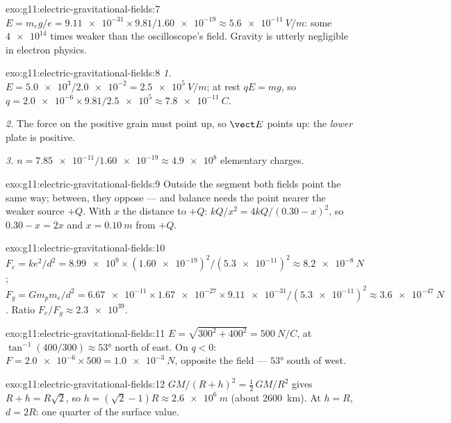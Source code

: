 \begin{solution}{exo:g11:electric-gravitational-fields:7}
$E = m_e g / e = \num{9.11e-31} \times 9.81 / \num{1.60e-19}
\approx \qty{5.6e-11}{V/m}$: some $\num{4e14}$ times weaker than the
oscilloscope's field. Gravity is utterly negligible in electron physics.
\end{solution}

\begin{solution}{exo:g11:electric-gravitational-fields:8}
\emph{1.} $E = \num{5.0e3} / \num{2.0e-2} = \qty{2.5e5}{V/m}$; at rest
$qE = mg$, so
$q = \num{2.0e-6} \times 9.81 / \num{2.5e5} \approx \qty{7.8e-11}{C}$.

\emph{2.} The force on the positive grain must point up, so $\vect E$
points up: the \emph{lower} plate is positive.

\emph{3.} $n = \num{7.85e-11} / \num{1.60e-19} \approx \num{4.9e8}$
elementary charges.
\end{solution}

\begin{solution}{exo:g11:electric-gravitational-fields:9}
Outside the segment both fields point the same way; between, they
oppose --- and balance needs the point nearer the weaker source $+Q$.
With $x$ the distance to $+Q$: $kQ/x^2 = 4kQ/(0.30 - x)^2$, so
$0.30 - x = 2x$ and $x = \qty{0.10}{m}$ from $+Q$.
\end{solution}

\begin{solution}{exo:g11:electric-gravitational-fields:10}
$F_e = ke^2/d^2 = \num{8.99e9} \times (\num{1.60e-19})^2 /
(\num{5.3e-11})^2 \approx \qty{8.2e-8}{N}$;
$F_g = G m_p m_e / d^2 = \num{6.67e-11} \times \num{1.67e-27} \times
\num{9.11e-31} / (\num{5.3e-11})^2 \approx \qty{3.6e-47}{N}$. Ratio
$F_e / F_g \approx \num{2.3e39}$.
\end{solution}

\begin{solution}{exo:g11:electric-gravitational-fields:11}
$E = \sqrt{300^2 + 400^2} = \qty{500}{N/C}$, at
$\tan^{-1}(400/300) \approx \ang{53}$ north of east. On $q < 0$:
$F = \num{2.0e-6} \times 500 = \qty{1.0e-3}{N}$, opposite the field ---
$\ang{53}$ south of west.
\end{solution}

\begin{solution}{exo:g11:electric-gravitational-fields:12}
$GM/(R+h)^2 = \tfrac12\,GM/R^2$ gives $R + h = R\sqrt{2}$, so
$h = (\sqrt{2} - 1)R \approx \qty{2.6e6}{m}$ (about \qty{2600}{km}). At
$h = R$, $d = 2R$: one quarter of the surface value.
\end{solution}


